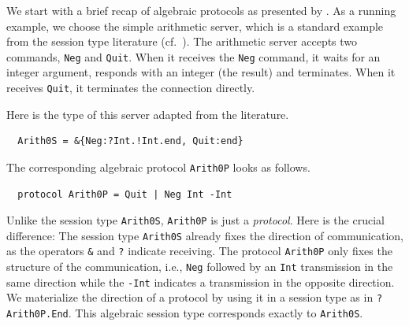 

We start with a brief recap of algebraic protocols as presented by \citet{DBLP:journals/pacmpl/MordidoS0V23}.
As a running example, we choose the simple arithmetic server, which is a
standard example from the session type literature (cf.\ 
\cite{DBLP:conf/esop/GayH99}). The arithmetic server
accepts two commands, \lstinline+Neg+ and \lstinline+Quit+. When it
receives the \lstinline+Neg+ command, it waits for an integer
argument, responds with an integer (the result) and terminates. When it receives \lstinline+Quit+, it terminates
the connection directly.

Here is the type of this server adapted from the literature.
\begin{lstlisting}
  Arith0S = &{Neg:?Int.!Int.end, Quit:end}
\end{lstlisting}

The corresponding algebraic protocol \lstinline+Arith0P+ looks as follows.
\begin{lstlisting}
  protocol Arith0P = Quit | Neg Int -Int
\end{lstlisting}
Unlike the session type \lstinline+Arith0S+, \lstinline+Arith0P+ is
just a \emph{protocol}. Here is
the crucial difference: 
The session type \lstinline+Arith0S+ already fixes the direction of communication, as the
operators \lstinline+&+ and \lstinline+?+ indicate receiving. The
protocol \lstinline+Arith0P+ only fixes the structure of the
communication, i.e., \lstinline+Neg+ followed by an \lstinline+Int+
transmission in the same direction while the \lstinline+-Int+ indicates a
transmission in the opposite direction. We materialize the direction
of a protocol by using it in a session type as in
\lstinline+?Arith0P.End+. This algebraic session type corresponds exactly to
\lstinline+Arith0S+. 

